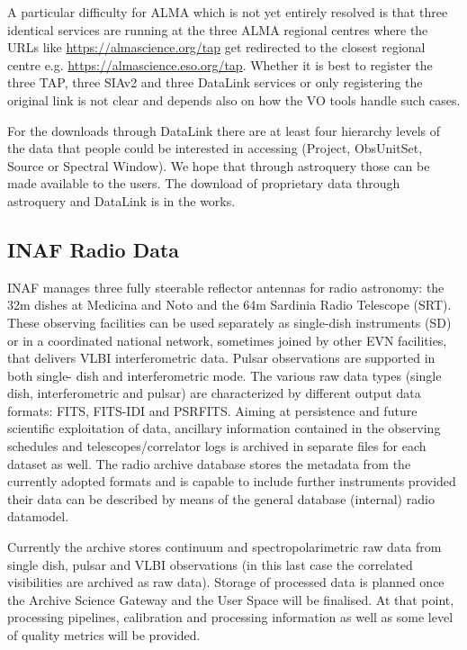 \documentclass[11pt,a4paper]{ivoa}
\begin{document}
A particular difficulty for ALMA which is not yet entirely resolved is that three identical services are 
running at the three ALMA regional centres where the URLs like \url{https://almascience.org/tap} get 
redirected
to the closest regional centre e.g. \url{https://almascience.eso.org/tap}.
Whether it is best to register the three TAP, three SIAv2 and three DataLink services or only 
registering the original link is not clear and depends also on how the VO tools handle such cases.

For the downloads through DataLink there are at least four hierarchy
levels of the data that people could be interested in accessing (Project, ObsUnitSet, Source or Spectral
Window). We hope that through astroquery those can be made available to the users. The download of
proprietary data through astroquery and DataLink is in the works.

\subsection{INAF Radio Data}
\label{sec:INAF}
INAF manages three fully steerable reflector antennas for radio astronomy: the 32m dishes at Medicina 
and Noto and the 64m Sardinia Radio Telescope (SRT). These observing facilities can be used separately 
as single-dish instruments (SD) or in a coordinated national network, sometimes joined by other EVN 
facilities, that delivers VLBI interferometric data. Pulsar observations are supported in both single-
dish and interferometric mode. The various raw data types (single dish, interferometric and pulsar) are 
characterized by different output data formats: FITS, FITS-IDI and PSRFITS. Aiming at persistence and 
future scientific exploitation of data, ancillary information contained in the observing schedules and 
telescopes/correlator logs is archived in separate files for each dataset as well. The radio archive 
database stores the metadata from the currently adopted formats and is capable to include further 
instruments provided their data can be described by means of the general database (internal) radio 
datamodel.

Currently the archive stores continuum and spectropolarimetric raw data from single dish, pulsar and 
VLBI observations (in this last case the correlated visibilities are archived as raw data). Storage of 
processed data is planned once the Archive Science Gateway and the User Space will be finalised. At that 
point, processing pipelines, calibration and processing information as well as some level of quality 
metrics will be provided.
\end{document}
